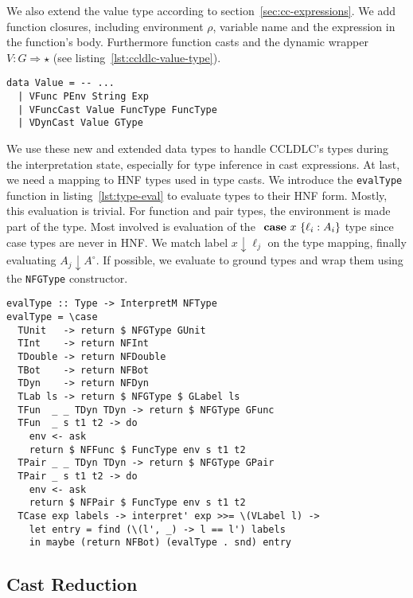 We also extend the value type according to section~\ref{sec:cc-expressions}. We add function closures, including environment $\rho$, variable name and the expression in the function's body. Furthermore function casts and the dynamic wrapper $V : G \Rightarrow \star$ (see listing~\ref{lst:ccldlc-value-type}).

\begin{lstlisting}[float,
  label=lst:ccldlc-value-type,
  caption=Value type extensions (\texttt{ProcessEnvironment.hs})]
data Value = -- ...
  | VFunc PEnv String Exp
  | VFuncCast Value FuncType FuncType
  | VDynCast Value GType
\end{lstlisting}

We use these new and extended data types to handle CCLDLC's types during the interpretation state, especially for type inference in cast expressions. At last, we need a mapping to HNF types used in type casts. We introduce the \texttt{evalType} function in listing~\ref{lst:type-eval} to evaluate types to their HNF form. Mostly, this evaluation is trivial. For function and pair types, the environment is made part of the type. Most involved is evaluation of the $\text{ \textbf{case} } x~\{\ell_i : A_i\}$ type since case types are never in HNF. We match label $x \downarrow \ell_j$ on the type mapping, finally evaluating $A_j \downarrow A^\circ$. If possible, we evaluate to ground types and wrap them using the \texttt{NFGType} constructor.

\begin{lstlisting}[float,
  caption=Type evaluation (\texttt{Interpreter.hs}),
  label=lst:type-eval]
evalType :: Type -> InterpretM NFType
evalType = \case
  TUnit   -> return $ NFGType GUnit
  TInt    -> return NFInt
  TDouble -> return NFDouble
  TBot    -> return NFBot
  TDyn    -> return NFDyn
  TLab ls -> return $ NFGType $ GLabel ls
  TFun  _ _ TDyn TDyn -> return $ NFGType GFunc
  TFun  _ s t1 t2 -> do
    env <- ask
    return $ NFFunc $ FuncType env s t1 t2
  TPair _ _ TDyn TDyn -> return $ NFGType GPair
  TPair _ s t1 t2 -> do
    env <- ask
    return $ NFPair $ FuncType env s t1 t2
  TCase exp labels -> interpret' exp >>= \(VLabel l) ->
    let entry = find (\(l', _) -> l == l') labels
    in maybe (return NFBot) (evalType . snd) entry
\end{lstlisting}

\subsection{Cast Reduction}

